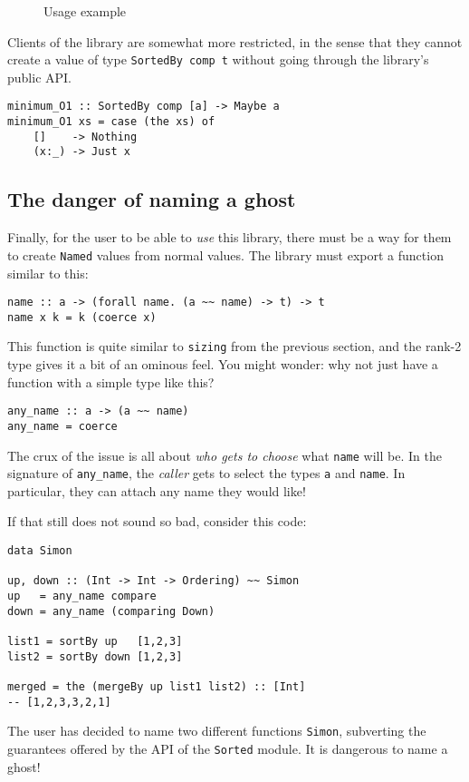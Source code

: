 \documentclass[format=sigplan, review=false, screen=true]{acmart}
\begin{document}
\begin{figure}
  \inputminted{haskell}{usageO.hs}
  \caption{Usage example}
  \end{figure}
Clients of the library are somewhat more restricted, in the sense that they cannot create a
value of type \texttt{SortedBy comp t} without going through the library's public API.

\begin{verbatim}
minimum_O1 :: SortedBy comp [a] -> Maybe a
minimum_O1 xs = case (the xs) of
    []    -> Nothing
    (x:_) -> Just x
\end{verbatim}

\subsection{The danger of naming a ghost}

Finally, for the user to be able to \emph{use} this library, there must be a way for
them to create \texttt{Named} values from normal values. The library must export a
function similar to this:

\begin{verbatim}
name :: a -> (forall name. (a ~~ name) -> t) -> t
name x k = k (coerce x)
\end{verbatim}

This function is quite similar to \texttt{sizing} from the previous section, and the rank-2
type gives it a bit of an ominous feel. You might wonder: why not just have a function
with a simple type like this?

\begin{verbatim}
any_name :: a -> (a ~~ name)
any_name = coerce
\end{verbatim}

The crux of the issue is all about \emph{who gets to choose} what \texttt{name} will be.
In the signature of \texttt{any\_name}, the \emph{caller} gets to select the types \texttt{a}
and \texttt{name}. In particular, they can attach any name they would like!

If that still does not sound so bad, consider this code:

\begin{verbatim}
data Simon
  
up, down :: (Int -> Int -> Ordering) ~~ Simon
up   = any_name compare
down = any_name (comparing Down)

list1 = sortBy up   [1,2,3]
list2 = sortBy down [1,2,3]

merged = the (mergeBy up list1 list2) :: [Int]
-- [1,2,3,3,2,1]
\end{verbatim}
\noindent
The user has decided to name two different functions \texttt{Simon}, subverting the
guarantees offered by the API of the \texttt{Sorted} module. It is dangerous to
name a ghost!
\end{document}
